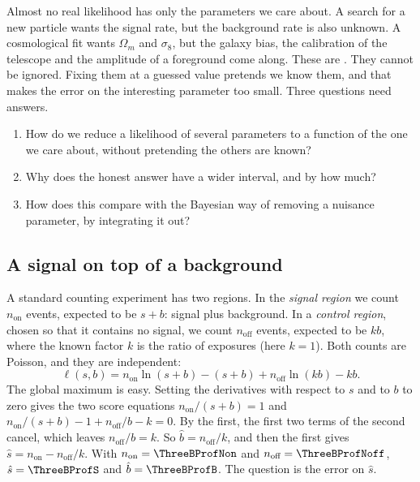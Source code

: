 Almost no real likelihood has only the parameters we care about. A search
for a new particle wants the signal rate, but the background rate is also
unknown. A cosmological fit wants $\Omega_m$ and $\sigma_8$, but the galaxy
bias, the calibration of the telescope and the amplitude of a foreground
come along. These are 
 . They cannot
be ignored. Fixing them at a guessed value pretends we know them, and that
makes the error on the interesting parameter too small. Three questions
need answers.
\begin{enumerate}[label=\arabic*.]
  \item How do we reduce a likelihood of several parameters to a function
        of the one we care about, without pretending the others are known?
  \item Why does the honest answer have a wider interval, and by how much?
  \item How does this compare with the Bayesian way of removing a nuisance
        parameter, by integrating it out?
\end{enumerate}

\subsection{A signal on top of a background}
\label{3b:sec:on-off}

A standard counting experiment has two regions. In the \emph{signal
region} we count $n_{\text{on}}$ events, expected to be $s+b$: signal plus
background. In a \emph{control region}, chosen so that it contains no
signal, we count $n_{\text{off}}$ events, expected to be $kb$, where the
known factor $k$ is the ratio of exposures (here $k=1$). Both counts are
Poisson, and they are independent:
\[
  \ell(s,b)=n_{\text{on}}\ln(s+b)-(s+b)+n_{\text{off}}\ln(kb)-kb .
\]
The global maximum is easy. Setting the derivatives with respect to $s$
and to $b$ to zero gives the two score equations
$n_{\text{on}}/(s+b)=1$ and $n_{\text{on}}/(s+b)-1+n_{\text{off}}/b-k=0$.
By the first, the first two terms of the second cancel, which leaves
$n_{\text{off}}/b=k$. So $\hat b=n_{\text{off}}/k$, and then the first gives
$\hat s=n_{\text{on}}-n_{\text{off}}/k$. With
$n_{\text{on}}=\ThreeBProfNon$ and $n_{\text{off}}=\ThreeBProfNoff$,
$\hat s=\ThreeBProfS$ and $\hat b=\ThreeBProfB$. The question is the error
on $\hat s$.

